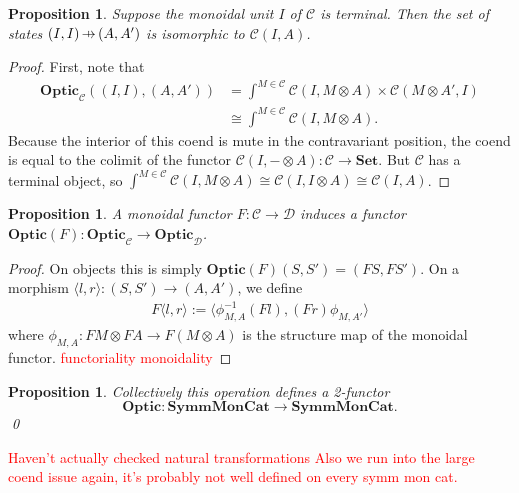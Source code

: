 \documentclass[11pt,a4paper]{article}
\theoremstyle{plain}
\newtheorem{proposition}[theorem]{Proposition}
\theoremstyle{definition}
\newtheorem{remark}[theorem]{Remark}
\newcommand{\C}{\mathscr{C}}
\newcommand{\D}{\mathscr{D}}
\newcommand{\Set}{\mathbf{Set}}
\newcommand{\SymmMonCat}{\mathbf{SymmMonCat}}
\newcommand{\Optic}{\mathbf{Optic}}
\newcommand{\hto}{\ensuremath{\,\mathaccent\shortmid\rightarrow\,}}
\newcommand{\todo}[1]{\textcolor{red}{\small #1}}
\begin{document}
\begin{proposition}
  Suppose the monoidal unit $I$ of $\C$ is terminal. Then the set of states $(I, I) \hto (A, A')$ is isomorphic to $\C(I, A)$.
\end{proposition}
\begin{proof}
  First, note that
  \begin{align*}
    \Optic_\C((I,I), (A,A'))
    &= \int^{M \in \C} \C(I, M \otimes A) \times \C(M \otimes A', I) \\
    &\cong \int^{M \in \C} \C(I, M \otimes A).
  \end{align*}
  Because the interior of this coend is mute in the contravariant position, the coend is equal to the colimit of the functor $\C(I, - \otimes A) : \C \to \Set$. But $\C$ has a terminal object, so $\int^{M \in \C} \C(I, M \otimes A) \cong \C(I, I \otimes A) \cong \C(I, A)$.
\end{proof}


\begin{proposition}\label{prop-change-of-action-monoidal}
  A monoidal functor $F : \C \to \D$ induces a functor $\Optic(F) : \Optic_\C \to \Optic_\D$.
\end{proposition}
\begin{proof}
  On objects this is simply $\Optic(F)(S, S') = (FS, FS')$. On a morphism $\langle l, r \rangle : (S, S') \to (A, A')$, we define
  \begin{align*}
    F\langle l, r \rangle := \langle \phi^{-1}_{M,A} (Fl), (Fr) \phi_{M,A'}\rangle
  \end{align*}
  where $\phi_{M,A} : FM \otimes FA \to F(M \otimes A)$ is the structure map of the monoidal functor.
  \todo{functoriality}
  \todo{monoidality}
\end{proof}

\begin{proposition}\label{prop-optic-functor}
  Collectively this operation defines a 2-functor \[\Optic : \SymmMonCat \to \SymmMonCat.\] \qed
\end{proposition}
\todo{Haven't actually checked natural transformations}
\todo{Also we run into the large coend issue again, it's probably not well defined on every symm mon cat.}
\end{document}
